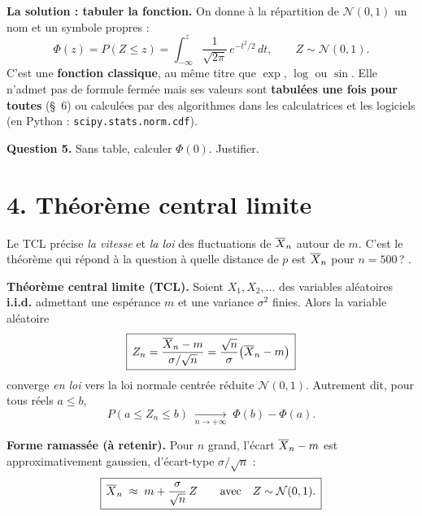 \medskip

\textbf{La solution : tabuler la fonction.}
On donne à la répartition de $\mathcal{N}(0,1)$ un nom et un
symbole propres :
\[
  \boxed{\,\Phi(z)=P(Z\le z)
  =\int_{-\infty}^{z}\dfrac{1}{\sqrt{2\pi}}\,e^{-t^2/2}\,dt,\qquad Z\sim\mathcal{N}(0,1).\,}
\]
C'est une \textbf{fonction classique}, au même titre que $\exp$,
$\log$ ou $\sin$. Elle n'admet pas de formule fermée mais ses
valeurs sont \textbf{tabulées une fois pour toutes} (§~6) ou
calculées par des algorithmes dans les calculatrices et
les logiciels (en Python : \texttt{scipy.stats.norm.cdf}).

\medskip

\textbf{Question 5.} Sans table, calculer $\Phi(0)$. Justifier.


\section*{4. Théorème central limite}

Le TCL précise \emph{la vitesse} et \emph{la loi} des fluctuations
de $\overline{X}_n$ autour de $m$. C'est le théorème qui répond à la question
\og à quelle distance de $p$ est $\overline{X}_n$ pour $n=500$\,? \fg.

\begin{mdframed}[backgroundcolor=ThemeLight, linecolor=Theme,
  linewidth=1pt, innertopmargin=8pt, innerbottommargin=8pt, nobreak=true]
\textbf{Théorème central limite (TCL).}
Soient $X_1, X_2, \dots$ des variables aléatoires \textbf{i.i.d.}
admettant une espérance $m$ et une variance $\sigma^2$ finies. Alors
la variable aléatoire
\[
  \boxed{\,Z_n=\dfrac{\overline{X}_n - m}{\sigma/\sqrt{n}}
  =\dfrac{\sqrt{n}}{\sigma}\bigl(\overline{X}_n - m\bigr)\,}
\]
converge \emph{en loi} vers la loi normale centrée réduite
$\mathcal{N}(0,1)$. Autrement dit, pour tous réels $a\le b$,
\[
  P(a\le Z_n\le b)\;\xrightarrow[n\to+\infty]{}\;
  \Phi(b)-\Phi(a).
\]
\end{mdframed}

\textbf{Forme ramassée (à retenir).}
Pour $n$ grand, l'écart $\overline{X}_n-m$ est approximativement gaussien,
d'écart-type $\sigma/\sqrt{n}$ :
\[
  \boxed{\,\overline{X}_n\;\approx\; m + \dfrac{\sigma}{\sqrt{n}}\,Z\qquad
  \text{avec}\quad Z\sim\mathcal{N}(0,1).\,}
\]

